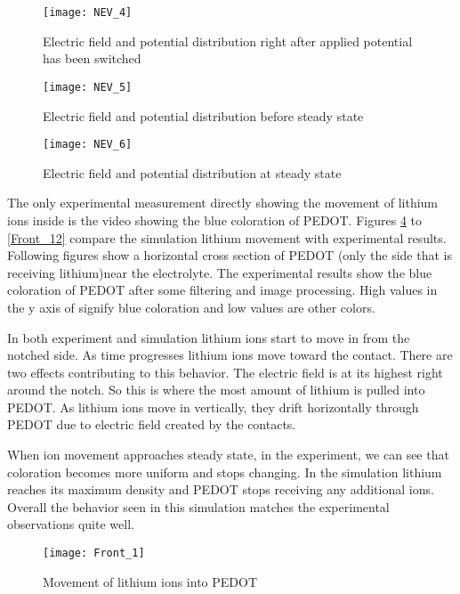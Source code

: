 \begin{figure}[!htp]
\centering
\texttt{[image: NEV\_4]}
\caption{Electric field and potential distribution right after applied potential has been switched} 
\label{NEV_4}
\end{figure}

\begin{figure}[!htp]
\centering
\texttt{[image: NEV\_5]}
\caption{Electric field and potential distribution before steady state} 
\label{NEV_5}
\end{figure}

\begin{figure}[!htp]
\centering
\texttt{[image: NEV\_6]}
\caption{Electric field and potential distribution at steady state} 
\label{NEV_6}
\end{figure}

The only experimental measurement directly showing the movement of lithium ions inside is the video showing the blue coloration of PEDOT. Figures \ref{Front_1} to \ref{Front_12} compare the simulation lithium movement with experimental results. Following figures show a horizontal cross section of PEDOT (only the side that is receiving lithium)near the electrolyte. The experimental results show the blue coloration of PEDOT after some filtering and image processing. High values in the y axis of signify blue coloration and low values are other colors. 

In both experiment and simulation lithium ions start to move in from the notched side. As time progresses lithium ions move toward the contact. There are two effects contributing to this behavior. The electric field is at its highest right around the notch. So this is where the most amount of lithium is pulled into PEDOT. As lithium ions move in vertically, they drift horizontally through PEDOT due to electric field created by the contacts.

When ion movement approaches steady state, in the experiment, we can see that coloration becomes more uniform and stops changing. In the simulation lithium reaches its maximum density and PEDOT stops receiving any additional ions. Overall the behavior seen in this simulation matches the experimental observations quite well. 
 
\begin{figure}[!htp]
\centering
\texttt{[image: Front\_1]}
\caption{Movement of lithium ions into PEDOT} 
\label{Front_1}
\end{figure}

